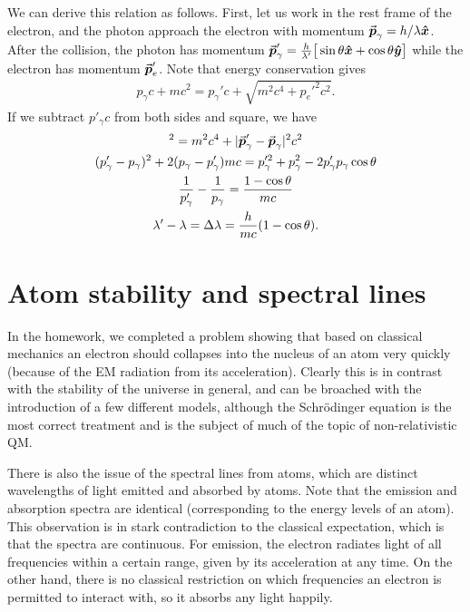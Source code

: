 We can derive this relation as follows.
First, let us work in the rest frame of the electron, and the photon approach the electron with momentum $\va*{p}_{\gamma} = h/\lambda \vu*{x}$.
After the collision, the photon has momentum $\va*{p}'_{\gamma} = \frac{h}{\lambda'} \big[ \sin{\theta} \vu*{x} + \cos{\theta} \vu*{y} \big]$ while the electron has momentum $\va*{p}'_{e}$.
Note that energy conservation gives
\begin{eqnarray}
    p_{\gamma} c + m c^2 = p_{\gamma}' c + \sqrt{m^2 c^4 + p_{e}'^2 c^2}
.\end{eqnarray}
If we subtract $p'_{\gamma} c$  from both sides and square, we have
\begin{gather}
    [ (p_{\gamma} - p'_{\gamma}) c + m c^2 ]^2 = m^2 c^4 + |\va*{p}_{\gamma}' - \va*{p}_{\gamma}|^2 c^2 \nonumber \\
    (p_{\gamma}' - p_{\gamma})^2 + 2(p_{\gamma} - p_{\gamma}') m c = p_{\gamma}'^2 + p_{\gamma}^2 - 2 p_{\gamma}' p_{\gamma} \cos{\theta} \nonumber \\
    \frac{1}{p_{\gamma}'} - \frac{1}{p_{\gamma}} = \frac{1 - \cos{\theta}}{mc} \nonumber \\
    \lambda' - \lambda = \Delta \lambda = \frac{h}{mc} (1 - \cos{\theta})
.\end{gather}



\section{Atom stability and spectral lines}

In the homework, we completed a problem showing that based on classical mechanics an electron should collapses into the nucleus of an atom very quickly (because of the EM radiation from its acceleration).
Clearly this is in contrast with the stability of the universe in general, and can be broached with the introduction of a few different models, although the Schr\"{o}dinger equation is the most correct treatment and is the subject of much of the topic of non-relativistic QM.

There is also the issue of the spectral lines from atoms, which are distinct wavelengths of light emitted and absorbed by atoms.
Note that the emission and absorption spectra are identical (corresponding to the energy levels of an atom).
This observation is in stark contradiction to the classical expectation, which is that the spectra are continuous.
For emission, the electron radiates light of all frequencies within a certain range, given by its acceleration at any time.
On the other hand, there is no classical restriction on which frequencies an electron is permitted to interact with, so it absorbs any light happily.






